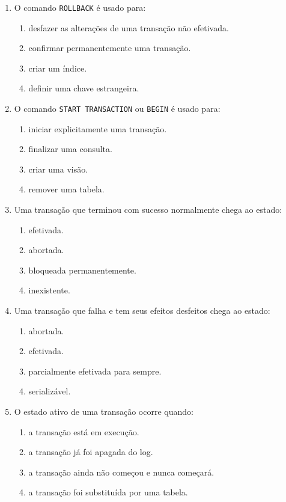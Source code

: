 \documentclass[12pt,a4paper]{article}
\begin{document}
\begin{enumerate}[label=\textbf{Q\arabic*.}]
\item O comando \texttt{ROLLBACK} é usado para:

\begin{enumerate}[label=\alph*)]
    \item desfazer as alterações de uma transação não efetivada.
    \item confirmar permanentemente uma transação.
    \item criar um índice.
    \item definir uma chave estrangeira.
\end{enumerate}

\item O comando \texttt{START TRANSACTION} ou \texttt{BEGIN} é usado para:

\begin{enumerate}[label=\alph*)]
    \item iniciar explicitamente uma transação.
    \item finalizar uma consulta.
    \item criar uma visão.
    \item remover uma tabela.
\end{enumerate}

\item Uma transação que terminou com sucesso normalmente chega ao estado:

\begin{enumerate}[label=\alph*)]
    \item efetivada.
    \item abortada.
    \item bloqueada permanentemente.
    \item inexistente.
\end{enumerate}

\item Uma transação que falha e tem seus efeitos desfeitos chega ao estado:

\begin{enumerate}[label=\alph*)]
    \item abortada.
    \item efetivada.
    \item parcialmente efetivada para sempre.
    \item serializável.
\end{enumerate}

\item O estado ativo de uma transação ocorre quando:

\begin{enumerate}[label=\alph*)]
    \item a transação está em execução.
    \item a transação já foi apagada do log.
    \item a transação ainda não começou e nunca começará.
    \item a transação foi substituída por uma tabela.
\end{enumerate}


\end{enumerate}
\end{document}
